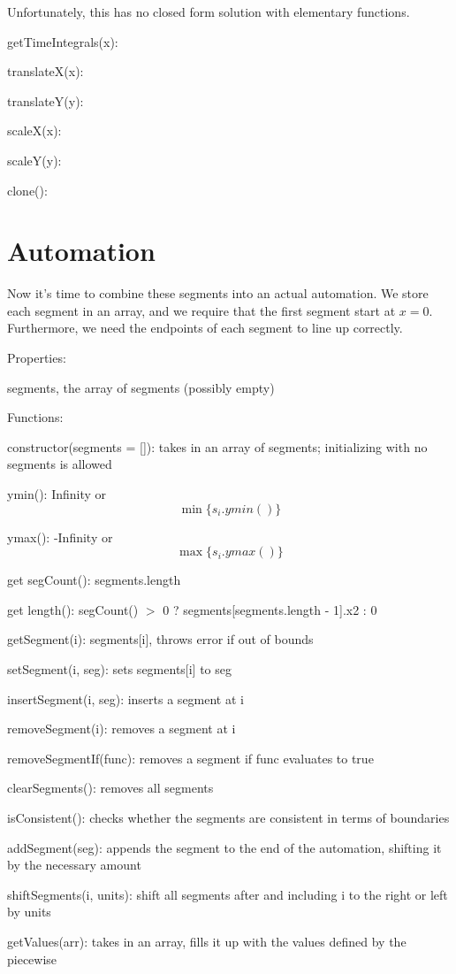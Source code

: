 \documentclass{article}
\begin{document}
Unfortunately, this has no closed form solution with elementary functions. 

getTimeIntegrals(x):

translateX(x):

translateY(y):

scaleX(x):

scaleY(y):

clone():

\section{Automation}

Now it's time to combine these segments into an actual automation. We store each segment in an array, and we require that the first segment start at $x=0$. Furthermore, we need the endpoints of each segment to line up correctly.

Properties:

segments, the array of segments (possibly empty)

Functions:

constructor(segments = []): takes in an array of segments; initializing with no segments is allowed

ymin(): Infinity or $$\min\{s_i.ymin()\}$$

ymax(): -Infinity or $$\max\{s_i.ymax()\}$$

get segCount(): segments.length

get length(): segCount() $>$ 0 ? segments[segments.length - 1].x2 : 0

getSegment(i): segments[i], throws error if out of bounds

setSegment(i, seg): sets segments[i] to seg

insertSegment(i, seg): inserts a segment at i

removeSegment(i): removes a segment at i

removeSegmentIf(func): removes a segment if func evaluates to true

clearSegments(): removes all segments

isConsistent(): checks whether the segments are consistent in terms of boundaries

addSegment(seg): appends the segment to the end of the automation, shifting it by the necessary amount

shiftSegments(i, units): shift all segments after and including i to the right or left by units

getValues(arr): takes in an array, fills it up with the values defined by the piecewise
\end{document}
